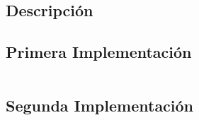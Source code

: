 \documentclass{report}
\begin{document}
        \subsection{Descripción}
          \paragraph*{}{

          }
        \subsection{Primera Implementación}
          \begin{lstlisting}[language=Python, caption=Implementación inicial del perceptron]
          \end{lstlisting}
        \subsection{Segunda Implementación}
\end{document}
